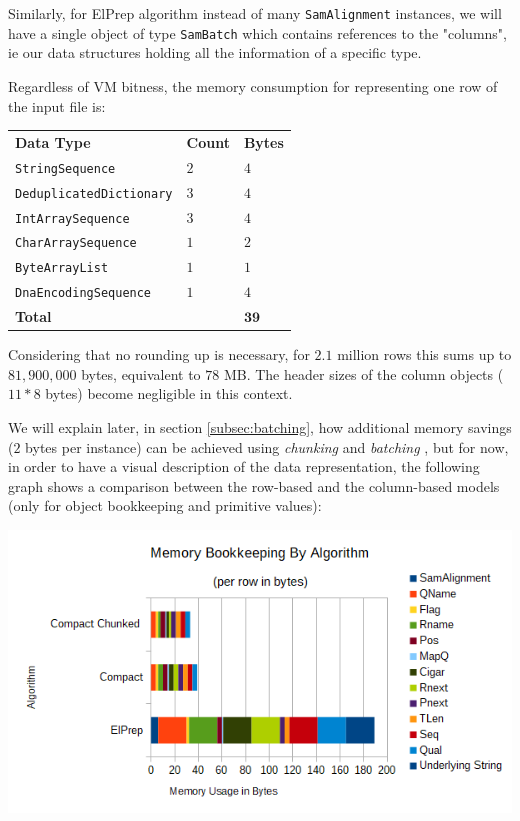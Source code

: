 \documentclass[a4paper,twoside]{article}
\begin{document}
Similarly, for ElPrep algorithm instead of many {\texttt{SamAlignment}} instances, we will have a single object of type {\texttt{SamBatch}} which contains references to the "columns", ie our data structures holding all the information of a specific type.


Regardless of VM bitness, the memory consumption for representing one row of the input file is: 
\begin{center}
\begin{tabular}{ l l l }
 {\textbf{Data Type}} 				& {\textbf{Count}} 		& {\textbf{Bytes}} \\
 {\texttt{StringSequence}} 		    & $2$ 				& $4$ \\
 {\texttt{DeduplicatedDictionary}}	& $3$ 				& $4$ \\
 {\texttt{IntArraySequence}}		& $3$		 		& $4$ \\
 {\texttt{CharArraySequence}}		& $1$				& $2$ \\
 {\texttt{ByteArrayList}}			& $1$				& $1$ \\
 {\texttt{DnaEncodingSequence}}	    & $1$ 				& $4$ \\
 {\textbf{Total}}					& 					& $\mathbf{39}$
\end{tabular}
\end{center}

Considering that no rounding up is necessary, for $2.1$ million rows this sums up to $81,900,000$ bytes,
equivalent to $78$ MB. The header sizes of the column objects ($11*8$ bytes) become negligible in this context.

We will explain later, in section \ref{subsec:batching}, how additional memory savings ($2$ bytes per instance) can be achieved using {\textit{chunking} } and {\textit{batching} }, but for now, in order to have a visual description of the data representation, the following graph shows a comparison between the row-based and the column-based models (only for object bookkeeping and primitive values):

\begin{center}
	\includegraphics[scale=0.35]{images/MemoryBookeeping.png}
\end{center}
\end{document}
